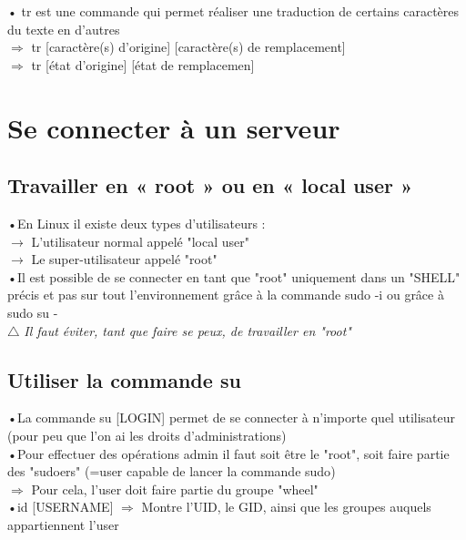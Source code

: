 \documentclass[a4paper, 11pt, french, oneside]{book}
\begin{document}
• tr est une commande qui permet réaliser une traduction de certains caractères du texte en d’autres\\
$\Rightarrow$ tr [caractère(s) d’origine] [caractère(s) de remplacement]\\
$\Rightarrow$ tr [état d’origine] [état de remplacemen]

\pagebreak 


\chapter{Se connecter à un serveur}
	\section{Travailler en « root » ou en « local user »}
	•En Linux il existe deux types d'utilisateurs :\\
$\rightarrow$ L'utilisateur normal appelé "local user"\\
$\rightarrow$ Le super-utilisateur appelé "root"\\

	•Il est possible de se connecter en tant que "root" uniquement dans un "SHELL" précis et pas sur tout
l’environnement grâce à la commande \color{red}sudo -i {\color{black}ou} grâce à sudo su -\\ 

$\triangle$ 
\textit{\color{black}
Il faut éviter, tant que faire se peux, de travailler en "root"}\\

\color{black}

	\section{Utiliser la commande {\color{red}su}}
	•La commande {\color{red}su [LOGIN]} permet de se connecter à n'importe quel utilisateur (pour peu que l'on ai les droits d'administrations)\\
	
	•Pour effectuer des opérations admin il faut soit être le "root", soit faire partie des "sudoers" (=user capable de lancer la commande {\color{red}sudo})\\
	$\Rightarrow$ Pour cela, l'user doit faire partie du groupe "wheel"\\
	
	•{\color{red}id [USERNAME]} $\Rightarrow$ Montre l'UID, le GID, ainsi que les groupes auquels appartiennent l'user\\
	
\end{document}
